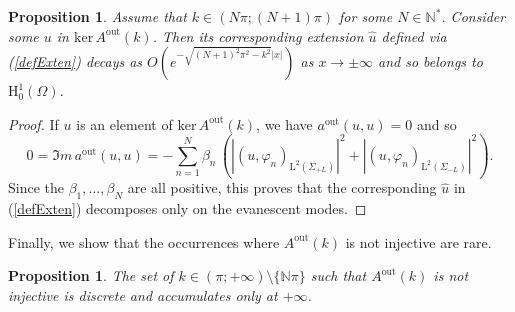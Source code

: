 \documentclass[11pt,a4paper]{report}
\newcommand{\Om}{\Omega}
\newcommand{\mrm}[1]{\mathrm{#1}}
\newcommand{\N}{\mathbb{N}}
\newcommand{\mL}{\mrm{L}}
\newcommand{\mH}{\mrm{H}}
\renewcommand{\ker}{\mrm{ker}}
\newtheorem{proposition}[theorem]{Proposition}
\begin{document}
\begin{proposition}\label{PropoTrappedModes}
Assume that $k\in(N\pi;(N+1)\pi)$ for some $N\in\N^\ast$. Consider some  $u$ in $\ker\,A^{\mrm{out}}(k)$. Then its corresponding extension $\hat{u}$ defined via (\ref{defExten}) decays as $O(e^{-\sqrt{(N+1)^2\pi^2-k^2}|x|})$ as $x\to\pm\infty$ and so belongs to $\mH^1_0(\Om)$. 
\end{proposition}
\begin{proof}
If $u$ is an element of $\ker\,A^{\mrm{out}}(k)$, we have $a^{\mrm{out}}(u,u)=0$ and so 
\[
0=\Im m\,a^{\mrm{out}}(u,u)=-\sum_{n=1}^{N} \beta_n\, (|(u,\varphi_n)_{\mL^2(\Sigma_{+L})}|^2+|(u,\varphi_n)_{\mL^2(\Sigma_{-L})}|^2).
\]
Since the $\beta_1,\dots,\beta_N$ are all positive, this proves that the corresponding $\hat{u}$ in (\ref{defExten}) decomposes only on the evanescent modes.
\end{proof}
\noindent Finally, we show that the occurrences where $A^{\mrm{out}}(k)$ is not injective are rare.
\begin{proposition}\label{PropoDiscreteTrappedModes}
The set of $k\in(\pi;+\infty)\setminus\{\N\pi\}$ such that $A^{\mrm{out}}(k)$ is not injective is discrete and accumulates only at $+\infty$.
\end{proposition}
\end{document}
